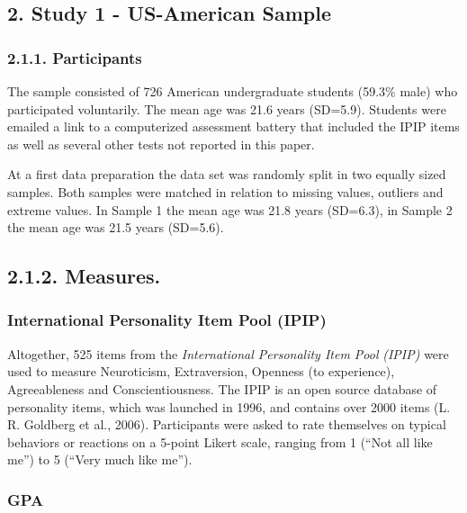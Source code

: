 \documentclass[floatsintext,man]{apa6}
\theoremstyle{definition}
\theoremstyle{definition}
\theoremstyle{definition}
\theoremstyle{remark}
\begin{document}
\hypertarget{study-1---us-american-sample}{%
\subsection{2. Study 1 - US-American
Sample}\label{study-1---us-american-sample}}

\hypertarget{participants}{%
\subsubsection{2.1.1. Participants}\label{participants}}

The sample consisted of 726 American undergraduate students (59.3\%
male) who participated voluntarily. The mean age was 21.6 years
(SD=5.9). Students were emailed a link to a computerized assessment
battery that included the IPIP items as well as several other tests not
reported in this paper.

At a first data preparation the data set was randomly split in two
equally sized samples. Both samples were matched in relation to missing
values, outliers and extreme values. In Sample 1 the mean age was 21.8
years (SD=6.3), in Sample 2 the mean age was 21.5 years (SD=5.6).

\hypertarget{measures.}{%
\subsection{2.1.2. Measures.}\label{measures.}}

\hypertarget{international-personality-item-pool-ipip}{%
\subsubsection{International Personality Item Pool
(IPIP)}\label{international-personality-item-pool-ipip}}

Altogether, 525 items from the \emph{International Personality Item
Pool} \emph{(IPIP)} were used to measure Neuroticism, Extraversion,
Openness (to experience), Agreeableness and Conscientiousness. The IPIP
is an open source database of personality items, which was launched in
1996, and contains over 2000 items (L. R. Goldberg et al., 2006).
Participants were asked to rate themselves on typical behaviors or
reactions on a 5-point Likert scale, ranging from 1 (\enquote{Not all
like me}) to 5 (\enquote{Very much like me}).

\hypertarget{gpa}{%
\subsubsection{GPA}\label{gpa}}
\end{document}
